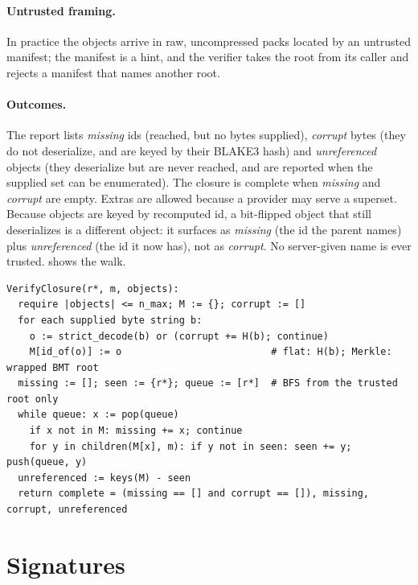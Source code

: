 \documentclass[10pt,letterpaper]{article}
\theoremstyle{remark}
\begin{document}
\paragraph{Untrusted framing.}
In practice the objects arrive in raw, uncompressed packs located by an
untrusted manifest; the manifest is a hint, and the verifier takes the root
from its caller and rejects a manifest that names another root.

\paragraph{Outcomes.}
The report lists \emph{missing} ids (reached, but no bytes supplied),
\emph{corrupt} bytes (they do not deserialize, and are keyed by their BLAKE3
hash) and \emph{unreferenced} objects (they deserialize but are never reached,
and are reported when the supplied set can be enumerated). The closure is
complete when \emph{missing} and \emph{corrupt} are empty. Extras are allowed
because a provider may serve a superset. Because objects are keyed by
recomputed id, a bit-flipped object that still deserializes is a different
object: it surfaces as \emph{missing} (the id the parent names) plus
\emph{unreferenced} (the id it now has), not as \emph{corrupt}. No server-given
name is ever trusted.  shows the walk.

\begin{algorithm}[!htb]
\caption{Closure verification over untrusted object bytes. $n_{\max}$ is the
object cap of \cref{tab:bounds}.}\label{alg:closure}
\begin{lstlisting}[style=kitalgo]
VerifyClosure(r*, m, objects):
  require |objects| <= n_max; M := {}; corrupt := []
  for each supplied byte string b:
    o := strict_decode(b) or (corrupt += H(b); continue)
    M[id_of(o)] := o                          # flat: H(b); Merkle: wrapped BMT root
  missing := []; seen := {r*}; queue := [r*]  # BFS from the trusted root only
  while queue: x := pop(queue)
    if x not in M: missing += x; continue
    for y in children(M[x], m): if y not in seen: seen += y; push(queue, y)
  unreferenced := keys(M) - seen
  return complete = (missing == [] and corrupt == []), missing, corrupt, unreferenced
\end{lstlisting}
\end{algorithm}

\section{Signatures}\label{sec:signing}
\end{document}
